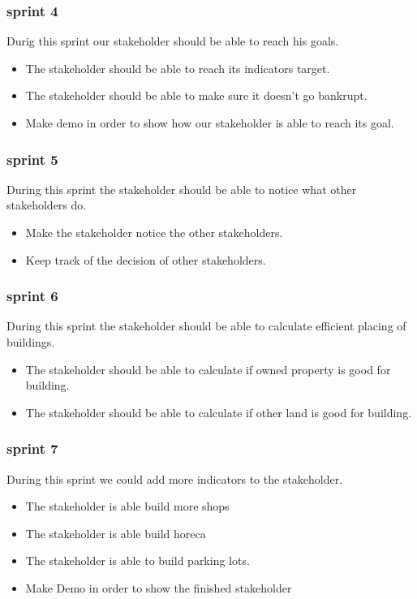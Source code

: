 \subsubsection{sprint 4}
Durig this sprint our stakeholder should be able to reach his goals.
\begin{itemize}
	\item The stakeholder should be able to reach its indicators target.
	\item The stakeholder should be able to make sure it doesn't go bankrupt.
	\item Make demo in order to show how our stakeholder is able to reach its goal.
\end{itemize} 

\subsubsection{sprint 5}
During this sprint the stakeholder should be able to notice what other stakeholders do.
\begin{itemize}
	\item Make the stakeholder notice the other stakeholders.
	\item Keep track of the decision of other stakeholders.
\end{itemize}

\subsubsection{sprint 6}
During this sprint the stakeholder should be able to calculate efficient placing of buildings.
\begin{itemize}
	\item The stakeholder should be able to calculate if owned property is good for building.
	\item The stakeholder should be able to calculate if other land is good for building.
\end{itemize}

\subsubsection{sprint 7}
During this sprint we could add more indicators to the stakeholder.
\begin{itemize}
	\item The stakeholder is able build more shops
	\item The stakeholder is able build horeca
	\item The stakeholder is able to build parking lots.
	\item Make Demo in order to show the finished stakeholder
\end{itemize}

